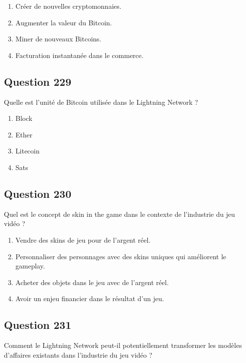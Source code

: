 \documentclass[12pt,a4paper]{article}
\begin{document}
\begin{enumerate}[label=\Alph*., leftmargin=*]
\item Créer de nouvelles cryptomonnaies.
\item Augmenter la valeur du Bitcoin.
\item Miner de nouveaux Bitcoins.
\item Facturation instantanée dans le commerce.
\end{enumerate}

\bigskip


\subsection*{Question 229}
Quelle est l'unité de Bitcoin utilisée dans le Lightning Network ?

\begin{enumerate}[label=\Alph*., leftmargin=*]
\item Block
\item Ether
\item Litecoin
\item Sats
\end{enumerate}

\bigskip


\subsection*{Question 230}
Quel est le concept de skin in the game dans le contexte de l'industrie du jeu vidéo ?

\begin{enumerate}[label=\Alph*., leftmargin=*]
\item Vendre des skins de jeu pour de l'argent réel.
\item Personnaliser des personnages avec des skins uniques qui améliorent le gameplay.
\item Acheter des objets dans le jeu avec de l'argent réel.
\item Avoir un enjeu financier dans le résultat d'un jeu.
\end{enumerate}

\bigskip


\subsection*{Question 231}
Comment le Lightning Network peut-il potentiellement transformer les modèles d'affaires existants dans l'industrie du jeu vidéo ?
\end{document}
